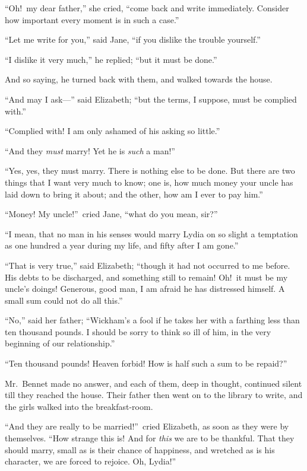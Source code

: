 \documentclass[12pt,english,oneside]{book}
\begin{document}
{}``Oh!\ my dear father,'' she cried, {}``come back and write
immediately. Consider how important every moment is in such a case.''

{}``Let me write for you,'' said Jane, {}``if you dislike the trouble
yourself.''

{}``I dislike it very much,'' he replied; {}``but it must be done.''

And so saying, he turned back with them, and walked towards the house.

{}``And may I ask\mbox{---}'' said Elizabeth; {}``but the terms,
I suppose, must be complied with.''

{}``Complied with! I am only ashamed of his asking so little.''

{}``And they \textit{must} marry! Yet he is \textit{such} a man!''\ 

{}``Yes, yes, they must marry. There is nothing else to be done.
But there are two things that I want very much to know; one is, how
much money your uncle has laid down to bring it about; and the other,
how am I ever to pay him.''

{}``Money! My uncle!''\ cried Jane, {}``what do you mean, sir?''\ 

{}``I mean, that no man in his senses would marry Lydia on so slight
a temptation as one hundred a year during my life, and fifty after
I am gone.''

{}``That is very true,'' said Elizabeth; {}``though it had not
occurred to me before. His debts to be discharged, and something still
to remain! Oh!\ it must be my uncle's doings! Generous, good man,
I am afraid he has distressed himself. A small sum could not do all
this.''

{}``No,'' said her father; {}``Wickham's a fool if he takes her
with a farthing less than ten thousand pounds. I should be sorry to
think so ill of him, in the very beginning of our relationship.''

{}``Ten thousand pounds! Heaven forbid! How is half such a sum to
be repaid?''\ 

Mr.\ Bennet made no answer, and each of them, deep in thought, continued
silent till they reached the house. Their father then went on to the
library to write, and the girls walked into the breakfast-room.

{}``And they are really to be married!''\ cried Elizabeth, as soon
as they were by themselves. {}``How strange this is! And for \textit{this}
we are to be thankful. That they should marry, small as is their chance
of happiness, and wretched as is his character, we are forced to rejoice.
Oh, Lydia!''\ 
\end{document}
